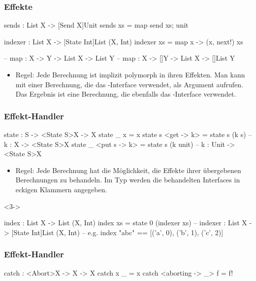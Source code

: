 \documentclass{beamer}
\begin{document}
\begin{frame}[fragile]
  \frametitle{Effekte}

\begin{frankcode}
sends : List X -> [Send X]Unit
sends xs = map send xs; unit

indexer : List X -> [State Int]List (X, Int)
indexer xs = map {x -> (x, next!)} xs

-- map : {X ->   Y} -> List X ->   List Y
-- map : {X -> []Y} -> List X -> []List Y
\end{frankcode}

\begin{itemize}
  \item<2->
    Regel: Jede Berechnung ist implizit polymorph in ihren Effekten.
    Man kann  mit einer Berechnung, die das -Interface verwendet, als Argument aufrufen.
    Das Ergebnis ist eine Berechnung, die ebenfalls das -Interface verwendet.
\end{itemize}
\end{frame}

\begin{frame}[fragile]
  \frametitle{Effekt-Handler}

\begin{frankcode}
state : S -> <State S>X -> X
state _ x            = x
state s <get -> k>   = state s (k s)
  -- k : X -> <State S>X
state _ <put s -> k> = state s (k unit)
  -- k : Unit -> <State S>X
\end{frankcode}

\begin{itemize}
  \item<2->
    Regel: Jede Berechnung hat die Möglichkeit, die Effekte ihrer übergebenen Berechnungen zu behandeln.
    Im Typ werden die behandelten Interfaces in eckigen Klammern angegeben.
\end{itemize}

\begin{visibleenv}<3->
\begin{frankcode}
index : List X -> List (X, Int)
index xs = state 0 (indexer xs)
  -- indexer : List X -> [State Int]List (X, Int)
  -- e.g. index "abc" == [('a', 0), ('b', 1), ('c', 2)]
\end{frankcode}
\end{visibleenv}

\end{frame}

\begin{frame}[fragile]
  \frametitle{Effekt-Handler}

\begin{frankcode}
catch : <Abort>X -> {X} -> X
catch x               _ = x
catch <aborting -> _> f = f!
\end{frankcode}

\end{frame}
\end{document}
